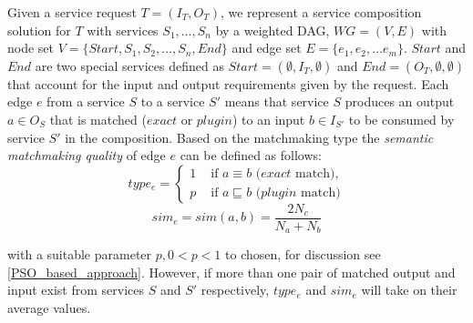 \documentclass{llncs}
\begin{document}

Given a service request $T=(I_T,O_T)$, we represent a service composition solution for $T$ with services $S_1,\ldots,S_n$  by a weighted DAG, $WG=(V,E)$ with node set $V=\{Start, S_1, S_2, \ldots, S_n, End\}$ and edge set $E = \{e_{1}, e_{2},... e_{m} \}$. $Start$ and $End$ are two special services defined as $Start = (\emptyset, I_T, \emptyset )$ and $End  = (O_T, \emptyset, \emptyset)$ that account for the input and output requirements given by the request. 
Each edge $e$ from a service $S$ to a service $S'$ means that service $S$ produces an output $a\in O_S$ that is matched ($exact$ or $plugin$) to an input $b\in I_{S'}$ to be consumed by service $S'$ in the composition. Based on the matchmaking type the \emph{semantic matchmaking quality} of edge $e$ can be defined as follows:
\vspace{-0.2cm}
\begin{equation}
\label{equation10}
type_e = 
\begin{cases}
	1 & \text{ if $a\equiv b$ ($exact$ match)},\\
	p & \text{ if $a \sqsubseteq b$ ($plugin$ match)}
\end{cases}
\end{equation}
\begin{equation}
\label{equation11}
sim_e = sim(a,b) = \frac{2N_c}{N_{a}+N_{b}}
\end{equation}

\noindent with a suitable parameter $p, 0<p< 1$ to chosen, for discussion see \ref{PSO_based_approach}. However, if more than one pair of matched output and input exist from services $S$ and $S'$ respectively, $type_e$ and $sim_e$ will take on their average values.


\end{document}
